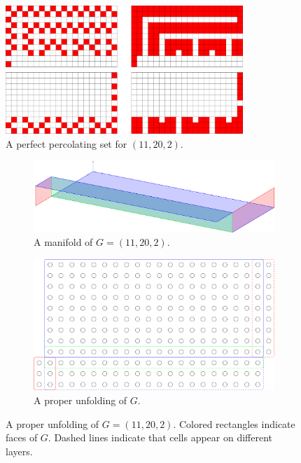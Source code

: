 
\begin{figure}[]
\centering
\includegraphics[width=0.8\textwidth]{figures/7/11x20x2.pdf}
\caption{A perfect percolating set for $(11,20,2)$.}
\label{fig:11x20x2}
\end{figure} 

\begin{figure}[]
\centering
\begin{subfigure}{0.45\textwidth}
	\includegraphics[width=\textwidth]{figures/7/11x20x2_manifold_3d.pdf}
	\caption{A manifold of $G= (11,20,2)$.}
	\label{}
\end{subfigure} \hfill%
\begin{subfigure}{0.45\textwidth}
	\includegraphics[width=\textwidth]{figures/7/11x20x2_manifold.pdf}
	\caption{A proper unfolding of $G$.}
	\label{}
\end{subfigure}
\caption{A proper unfolding of $G= (11,20,2)$. Colored rectangles indicate faces of $G$. Dashed lines indicate that cells appear on different layers. }
\label{fig:11x20x2_manifold}
\end{figure} 

